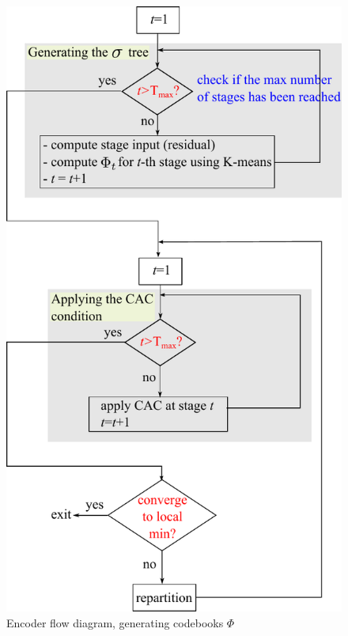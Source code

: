\begin{figure}[ht]
\centering
\includegraphics[height=0.6\textheight]{thesis/RVQ_encoder_flowDiagram.pdf}
\caption{Encoder flow diagram, generating codebooks $\Phi$}
\label{fig:RVQ_encoder_flowDiagram}
\end{figure}


